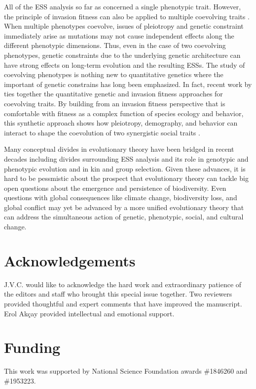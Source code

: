 \documentclass[11pt]{article}
\begin{document}
All of the ESS analysis so far as concerned a single phenotypic trait. However, the principle of invasion fitness can also be applied to multiple coevolving traits \cite{Leimar:2009,Mullon:Keller:2016,Mullon:Lehmann:2019}. When multiple phenotypes coevolve, issues of pleiotropy and genetic constraint immediately arise as mutations may not cause independent effects along the different phenotypic dimensions. Thus, even in the case of two coevolving phenotypes, genetic constraints due to the underlying genetic architecture can have strong effects on long-term evolution and the resulting ESSs. The study of coevolving phenotypes is nothing new to quantitative genetics \cite{Lande:1979,Lande:Arnold:1983,Phillips:Arnold:1989} where the important of genetic constrains has long been emphasized. In fact, recent work by \citeauthor{Mullon:Lehmann:2019} \cite{Mullon:Lehmann:2019} ties together the quantitative genetic and invasion fitness approaches for coevolving traits. By building from an invasion fitness perspective that is comfortable with fitness as a complex function of species ecology and behavior, this synthetic approach shows how pleiotropy, demography, and behavior can interact to shape the coevolution of two synergistic social traits \cite{Mullon:Lehmann:2019}.

Many conceptual divides in evolutionary theory have been bridged in recent decades including divides surrounding ESS analysis and its role in genotypic and phenotypic evolution and in kin and group selection. Given these advances, it is hard to be pessmistic about the prospect that evolutionary theory can tackle big open questions about the emergence and persistence of biodiversity. Even questions with global consequences like climate change, biodiversity loss, and global conflict may yet be advanced by a more unified evolutionary theory that can address the simultaneous action of genetic, phenotypic, social, and cultural change.

\section{Acknowledgements}

J.V.C. would like to acknowledge the hard work and extraordinary patience of the editors and staff who brought this special issue together. Two reviewers provided thoughtful and expert comments that have improved the manuscript. Erol Akçay provided intellectual and emotional support.

\section{Funding}

This work was supported by National Science Foundation awards \#1846260 and \#1953223.

\clearpage
\printbibliography
\end{document}
